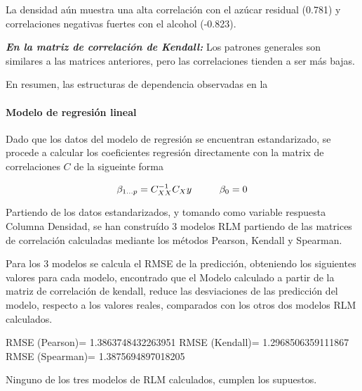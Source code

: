 \documentclass[11pt]{article}
\begin{document}
La densidad aún muestra una alta correlación con el azúcar residual
(0.781) y correlaciones negativas fuertes con el alcohol (-0.823).

\textbf{\emph{En la matriz de correlación de Kendall:}} Los patrones
generales son similares a las matrices anteriores, pero las
correlaciones tienden a ser más bajas.

En resumen, las estructuras de dependencia observadas en la

    \hypertarget{modelo-de-regresiuxf3n-lineal}{%
\paragraph{Modelo de regresión
lineal}\label{modelo-de-regresiuxf3n-lineal}}

Dado que los datos del modelo de regresión se encuentran estandarizado,
se procede a calcular los coeficientes regresión directamente con la
matrix de correlaciones \(C\) de la sigueinte forma

\[\beta_{1\ldots p}=C_{XX}^{-1}C_Xy \hspace{1 cm} \beta_0=0\]

Partiendo de los datos estandarizados, y tomando como variable respuesta
Columna Densidad, se han construído 3 modelos RLM partiendo de las
matrices de correlación calculadas mediante los métodos Pearson, Kendall
y Spearman.

Para los 3 modelos se calcula el RMSE de la predicción, obteniendo los
siguientes valores para cada modelo, encontrado que el Modelo calculado
a partir de la matriz de correlación de kendall, reduce las desviaciones
de las predicción del modelo, respecto a los valores reales, comparados
con los otros dos modelos RLM calculados.

RMSE (Pearson)= 1.3863748432263951 RMSE (Kendall)= 1.2968506359111867
RMSE (Spearman)= 1.3875694897018205

Ninguno de los tres modelos de RLM calculados, cumplen los supuestos.
\end{document}
